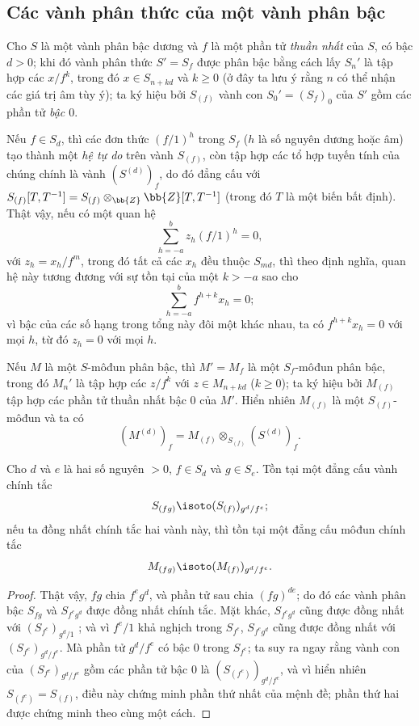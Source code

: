 \documentclass[oneside,10pt]{amsart}
\renewcommand{\geq}{\geqslant}
\newcommand{\oldpage}[2][]{\marginnote{\normalfont\footnotesize\textbf{#1}~|~#2}\ignorespaces}
\let\EGAOriginalLabel\label
\renewcommand{\label}[1]{\phantomsection\EGAOriginalLabel{#1}}
\begin{document}
\subsection{Các vành phân thức của một vành phân bậc}
\label{subsection:II.2.2}

\begin{env}[2.2.1]
\label{II.2.2.1}
Cho $S$ là một vành phân bậc dương và $f$ là một phần tử \emph{thuần nhất} của $S$, có bậc $d>0$; khi đó vành phân thức $S'=S_f$ được phân bậc bằng cách lấy $S_n'$ là tập hợp các $x/f^k$, trong đó $x\in S_{n+kd}$ và $k\geq0$ (ở đây ta lưu ý rằng $n$ có thể nhận các giá trị âm tùy ý); ta ký hiệu bởi $S_{(f)}$ vành con $S_0'=(S_f)_0$ của $S'$ gồm các phần tử \emph{bậc $0$}.

Nếu $f\in S_d$, thì các đơn thức $(f/1)^h$ trong $S_f$ ($h$ là số nguyên dương hoặc âm) tạo thành một \emph{hệ tự do} trên vành $S_{(f)}$, còn tập hợp các tổ hợp tuyến tính của chúng chính là
\oldpage[II]{24}
vành $(S^{(d)})_f$, do đó đẳng cấu với $S_{(f)}[T,T^{-1}]=S_{(f)}\otimes_\bb{Z}\bb{Z}[T,T^{-1}]$ (trong đó $T$ là một biến bất định).
Thật vậy, nếu có một quan hệ
\[
  \sum_{h=-a}^{b}z_h(f/1)^h=0,
\]
với $z_h=x_h/f^m$, trong đó tất cả các $x_h$ đều thuộc $S_{md}$, thì theo định nghĩa, quan hệ này tương đương với sự tồn tại của một $k>-a$ sao cho
\[
  \sum_{h=-a}^{b}f^{h+k}x_h=0;
\]
vì bậc của các số hạng trong tổng này đôi một khác nhau, ta có $f^{h+k}x_h=0$ với mọi $h$, từ đó $z_h=0$ với mọi $h$.

Nếu $M$ là một $S$-môđun phân bậc, thì $M'=M_f$ là một $S_f$-môđun phân bậc, trong đó $M_n'$ là tập hợp các $z/f^k$ với $z\in M_{n+kd}$ ($k\geq0$); ta ký hiệu bởi $M_{(f)}$ tập hợp các phần tử thuần nhất bậc $0$ của $M'$.
Hiển nhiên $M_{(f)}$ là một $S_{(f)}$-môđun và ta có
\[
  (M^{(d)})_f=M_{(f)}\otimes_{S_{(f)}}(S^{(d)})_f.
\]
\end{env}

\begin{lemma}[2.2.2]
\label{II.2.2.2}
Cho $d$ và $e$ là hai số nguyên $>0$, $f\in S_d$ và $g\in S_e$.
Tồn tại một đẳng cấu vành chính tắc
\[
  S_{(fg)}\isoto(S_{(f)})_{g^d/f^e};
\]
nếu ta đồng nhất chính tắc hai vành này, thì tồn tại một đẳng cấu môđun chính tắc
\[
  M_{(fg)}\isoto(M_{(f)})_{g^d/f^e}.
\]
\end{lemma}

\begin{proof}
Thật vậy, $fg$ chia $f^eg^d$, và phần tử sau chia $(fg)^{de}$; do đó các vành phân bậc $S_{fg}$ và $S_{f^eg^d}$ được đồng nhất chính tắc.
Mặt khác, $S_{f^eg^d}$ cũng được đồng nhất với $(S_{f^e})_{g^d/1}$ ; và vì $f^e/1$ khả nghịch trong $S_{f^e}$, $S_{f^eg^d}$ cũng được đồng nhất với $(S_{f^e})_{g^d/f^e}$.
Mà phần tử $g^d/f^e$ có bậc $0$ trong $S_{f^e}$; ta suy ra ngay rằng vành con của $(S_{f^e})_{g^d/f^e}$ gồm các phần tử bậc $0$ là $(S_{(f^e)})_{g^d/f^e}$, và vì hiển nhiên $S_{(f^e)}=S_{(f)}$, điều này chứng minh phần thứ nhất của mệnh đề; phần thứ hai được chứng minh theo cùng một cách.
\end{proof}
\end{document}
